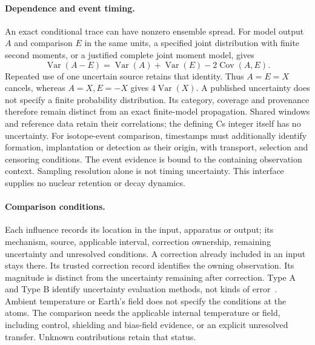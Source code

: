 \paragraph{Dependence and event timing.}
An exact conditional trace can have nonzero ensemble spread.
For model output \(A\) and comparison \(E\) in the same units, a specified
joint distribution with finite second moments, or a justified complete joint
moment model, gives
\begin{equation}
 \operatorname{Var}(A-E)=\operatorname{Var}(A)+\operatorname{Var}(E)
       -2\operatorname{Cov}(A,E).
 \label{eq:manual-m3-residual-dependence}
\end{equation}
Repeated use of one uncertain source retains that identity. Thus \(A=E=X\)
cancels, whereas \(A=X,E=-X\) gives \(4\operatorname{Var}(X)\).
A published uncertainty does not specify a finite probability distribution.
Its category, coverage and provenance therefore remain distinct from an exact
finite-model propagation. Shared windows and reference data retain their
correlations; the defining Cs integer itself has no uncertainty.
For isotope-event comparison, timestamps must additionally identify formation,
implantation or detection as their origin, with transport, selection and
censoring conditions. The event evidence is bound to the containing observation
context. Sampling resolution alone is not timing uncertainty.
This interface supplies no nuclear retention or decay dynamics.

\paragraph{Comparison conditions.}
Each influence records its location in the input, apparatus or output; its
mechanism, source, applicable interval, correction ownership, remaining
uncertainty and unresolved conditions. A correction already included in an
input stays there. Its trusted correction record identifies the owning observation.
Its magnitude is distinct from the uncertainty remaining
after correction. Type A and Type B identify uncertainty evaluation methods,
not kinds of error~\cite{nist-tn1297-comparison}.
Ambient temperature or Earth's field does not specify the conditions at the
atoms. The comparison needs the applicable internal temperature or field,
including control, shielding and bias-field evidence, or an explicit unresolved
transfer. Unknown contributions retain that status.

